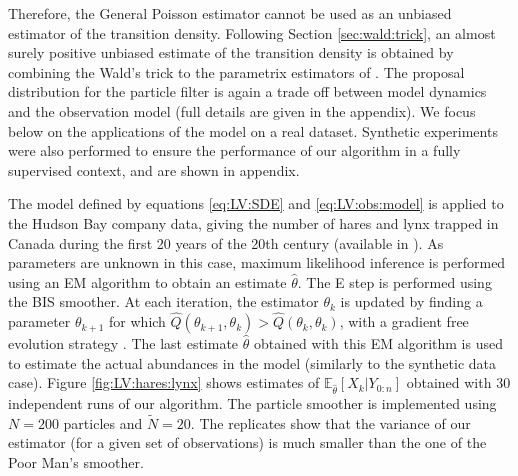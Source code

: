 \documentclass[12pt]{article}
\def\pE{\mathbb{E}}
\begin{document}
Therefore, the General Poisson estimator cannot be used as an unbiased estimator of the transition density. 
Following Section \ref{sec:wald:trick}, an almost surely positive unbiased estimate of the transition density is obtained by combining the Wald's trick to the parametrix estimators of \cite{fearnhead2017continuous}.
The proposal distribution for the particle filter is again a trade off between model dynamics and the observation model (full details are given in the appendix). We focus below on the applications of the model on a real dataset. Synthetic experiments were also performed to ensure the performance of our algorithm in a fully supervised context, and are shown in appendix.



The model defined by equations \eqref{eq:LV:SDE} and \eqref{eq:LV:obs:model} is applied to the Hudson Bay company data, giving the number of hares and lynx trapped in Canada during the first 20 years of the 20th century (available in \cite{odum1971fundamentals}). 
As parameters are unknown in this case, maximum likelihood inference is performed using an EM \cite{dempster1977maximum} algorithm to obtain an estimate $\hat{\theta}$.
The E step is performed using the BIS smoother.
At each iteration, the estimator $\theta_k$ is updated by finding a parameter $\theta_{k+1}$ for which $\hat Q(\theta_{k+1},\theta_k) >  \hat Q(\theta_k,\theta_k)$, with  a gradient free evolution strategy \cite{hansen2006cma}. 
The last estimate $\hat{\theta}$ obtained with this EM algorithm  is used to  estimate the actual abundances in the model (similarly to the synthetic data case). 
Figure \ref{fig:LV:hares:lynx} shows  estimates of $\pE_{\hat{\theta}}\left[ X_k \vert Y_{0:n}\right]$ obtained with 30 independent runs of our algorithm. 
The particle smoother is implemented using $N = 200$ particles and $\tilde{N}=20$. 
The replicates show that the variance of our estimator (for a given set of observations) is much smaller than the one of the Poor Man's smoother.
\end{document}
